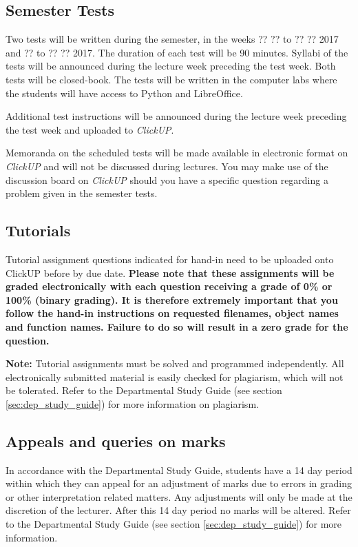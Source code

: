     \subsection{Semester Tests}
        Two tests will be written during the semester, in the weeks ?? ??
        to ?? ?? 2017 and ?? to ?? ?? 2017. The duration of each test will
        be 90 minutes. Syllabi of the tests will be announced during the
        lecture week preceding the test week. Both tests will be closed-book.
        The tests will be written in the computer labs where the students will
        have access to Python and LibreOffice.

        Additional test instructions will be announced during the lecture
        week preceding the test week and uploaded to {\it ClickUP}.

        Memoranda on the scheduled tests will be made available in electronic
        format on {\it ClickUP} and will not be discussed during lectures. You
        may make use of the discussion board on {\it ClickUP} should you have a
        specific question regarding a problem given in the semester tests.

    \subsection{Tutorials}
        Tutorial assignment questions indicated for hand-in need to be
        uploaded onto ClickUP before by due date. \textbf{Please note that
        these assignments will be graded electronically with each
        question receiving a grade of 0\% or 100\% (binary grading). It
        is therefore extremely important that you follow the hand-in
        instructions on requested filenames, object names and function
        names. Failure to do so will result in a zero grade for the
        question.}

        \textbf{Note:} Tutorial assignments must be solved and programmed
        independently. All electronically submitted material is easily checked
        for plagiarism, which will not be tolerated. Refer to the Departmental
        Study Guide (see section \ref{sec:dep_study_guide}) for more
        information on plagiarism.

    \subsection{Appeals and queries on marks}
        In accordance with the Departmental Study Guide, students have a 14
        day period within which they can appeal for an adjustment of marks
        due to errors in grading or other interpretation related matters.
        Any adjustments will only be made at the discretion of the lecturer.
        After this 14 day period no marks will be altered. Refer to the
        Departmental Study Guide (see section \ref{sec:dep_study_guide})
        for more information.

